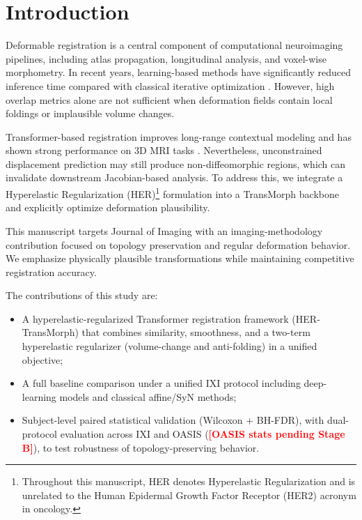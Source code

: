 \documentclass[jimaging,article,submit,pdftex,moreauthors]{Definitions/mdpi}
\providecommand{\PH}[1]{\textcolor{red}{\textbf{[#1]}}}
\begin{document}
\section{Introduction}

Deformable registration is a central component of computational neuroimaging pipelines, including atlas propagation, longitudinal analysis, and voxel-wise morphometry. In recent years, learning-based methods have significantly reduced inference time compared with classical iterative optimization \citep{balakrishnan2019voxelmorph,kim2021cyclemorph}. However, high overlap metrics alone are not sufficient when deformation fields contain local foldings or implausible volume changes.

Transformer-based registration improves long-range contextual modeling and has shown strong performance on 3D MRI tasks \citep{chen2022transmorph}. Nevertheless, unconstrained displacement prediction may still produce non-diffeomorphic regions, which can invalidate downstream Jacobian-based analysis. To address this, we integrate a Hyperelastic Regularization (HER)\footnote{Throughout this manuscript, HER denotes Hyperelastic Regularization and is unrelated to the Human Epidermal Growth Factor Receptor (HER2) acronym in oncology.} formulation into a TransMorph backbone and explicitly optimize deformation plausibility.

This manuscript targets Journal of Imaging with an imaging-methodology contribution focused on topology preservation and regular deformation behavior. We emphasize physically plausible transformations while maintaining competitive registration accuracy.

The contributions of this study are:
\begin{itemize}
\item A hyperelastic-regularized Transformer registration framework (HER-TransMorph) that combines similarity, smoothness, and a two-term hyperelastic regularizer (volume-change and anti-folding) in a unified objective;
\item A full baseline comparison under a unified IXI protocol including deep-learning models and classical affine/SyN methods;
\item Subject-level paired statistical validation (Wilcoxon + BH-FDR), with dual-protocol evaluation across IXI and OASIS (\PH{OASIS stats pending Stage B}), to test robustness of topology-preserving behavior.
\end{itemize}
\end{document}
